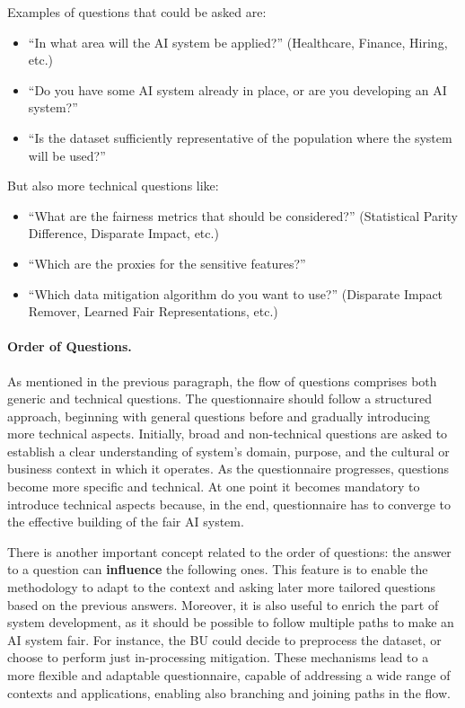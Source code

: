 \documentclass[12pt,a4paper,openright,twoside]{book}
\begin{document}
Examples of questions that could be asked are:
\begin{itemize}
    \item ``In what area will the \ac{AI} system be applied?'' (Healthcare, Finance, Hiring, etc.)
    \item ``Do you have some AI system already in place, or are you developing an AI system?''
    \item ``Is the dataset sufficiently representative of the population where the system will be used?''
\end{itemize}
%
But also more technical questions like:
\begin{itemize}
    \item ``What are the fairness metrics that should be considered?'' (Statistical Parity Difference, Disparate Impact, etc.)
    \item ``Which are the proxies for the sensitive features?''
    \item ``Which data mitigation algorithm do you want to use?'' (Disparate Impact Remover, Learned Fair Representations, etc.)
\end{itemize}


\paragraph{Order of Questions.}
As mentioned in the previous paragraph, the flow of questions comprises both generic and technical questions.
%
The questionnaire should follow a structured approach, beginning with general questions before and gradually introducing more technical aspects.
%
Initially, broad and non-technical questions are asked to establish a clear understanding of system’s domain, purpose, and the cultural or business context in which it operates.
%
As the questionnaire progresses, questions become more specific and technical.
%
At one point it becomes mandatory to introduce technical aspects because, in the end, questionnaire has to converge to the effective building of the fair \ac{AI} system.

There is another important concept related to the order of questions: the answer to a question can \textbf{influence} the following ones.
%
This feature is to enable the methodology to adapt to the context and asking later more tailored questions based on the previous answers.
%
Moreover, it is also useful to enrich the part of system development, as it should be possible to follow multiple paths to make an AI system fair.
%
For instance, the \acl{BU} could decide to preprocess the dataset, or choose to perform just in-processing mitigation.
%
These mechanisms lead to a more flexible and adaptable questionnaire, capable of addressing a wide range of contexts and applications, enabling also branching and joining paths in the flow.
\end{document}
